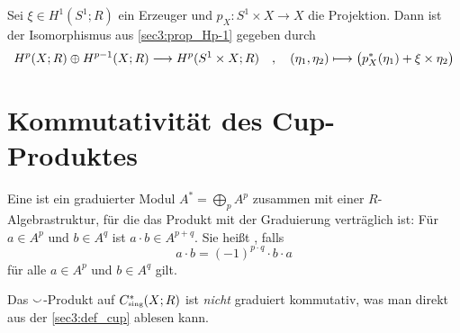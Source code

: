 \begin{bemerkung}[{name=[{Angabe der Abbildung in \ref{sec3:prop_Hp-1}}]},label=angabe_iso_s1]
	Sei $\xi \in H^1(S^1;R)$ ein Erzeuger und $p_X \colon S^1 \times X \to X$ die Projektion. Dann ist der Isomorphismus aus \autoref{sec3:prop_Hp-1} gegeben durch
	\[
		H^p \enbrace*{X;R} \oplus H^{p-1}(X;R) \longrightarrow H^p(S^1 \times X;R) \quad , \quad (\eta_1,\eta_2) \longmapsto \enbrace[\big]{p_X^*(\eta_1) + \xi\times \eta_2}
	\]
\end{bemerkung}
\newpage

\section{Kommutativität des Cup-Produktes} %
\label{sec:4}

\begin{definition}[{name=[graduierte Algebra]}]
	Eine  ist ein graduierter Modul $A^* = \bigoplus_p A^p$ zusammen mit einer $R$-Algebrastruktur, für die das Produkt mit der Graduierung verträglich ist: Für $a \in A^p$ und $b \in A^q$ ist $a \cdot b \in A^{p+q}$. Sie heißt , falls 
	\[
		a \cdot b =  (-1)^{p \cdot q} \cdot b \cdot a
	\]
	für alle $a \in A^p$ und $b \in A^q$ gilt.
\end{definition}

\begin{bemerkung}[{name=[Cup-Produkt auf $C^*$ nicht graduiert kommutativ]}]
	Das $\smallsmile$-Produkt auf $C^*_\sing(X;R)$ ist \emph{nicht} graduiert kommutativ, was man direkt aus der \autoref{sec3:def_cup} ablesen kann. 
\end{bemerkung}

